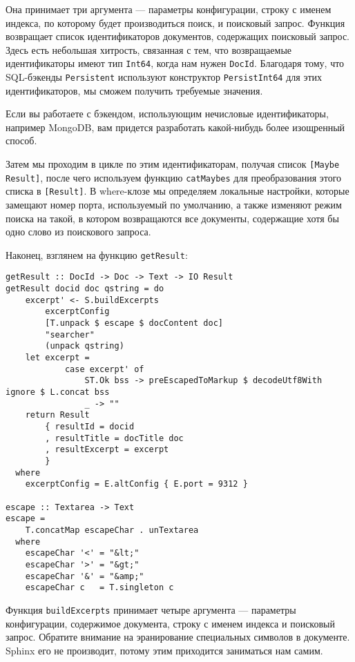 

Она принимает три аргумента --- параметры конфигурации, строку с именем индекса, по которому будет производиться поиск, и поисковый запрос. Функция возвращает список идентификаторов документов, содержащих поисковый запрос. Здесь есть небольшая хитрость, связанная с тем, что возвращаемые идентификаторы имеют тип \lstinline'Int64', когда нам нужен \lstinline'DocId'. Благодаря тому, что SQL-бэкенды \lstinline'Persistent' используют конструктор \lstinline'PersistInt64' для этих идентификаторов, мы сможем получить требуемые значения.

Если вы работаете с бэкендом, использующим нечисловые идентификаторы, например MongoDB, вам придется разработать какой-нибудь более изощренный способ.

Затем мы проходим в цикле по этим идентификаторам, получая список \lstinline'[Maybe Result]', после чего используем функцию \lstinline'catMaybes' для преобразования этого списка в \lstinline'[Result]'. В where-клозе мы определяем локальные настройки, которые замещают номер порта, используемый по умолчанию, а также изменяют режим поиска на такой, в котором возвращаются все документы, содержащие хотя бы одно слово из поискового запроса. %

Наконец, взглянем на функцию \lstinline'getResult':

\begin{lstlisting}
getResult :: DocId -> Doc -> Text -> IO Result
getResult docid doc qstring = do
    excerpt' <- S.buildExcerpts
        excerptConfig
        [T.unpack $ escape $ docContent doc]
        "searcher"
        (unpack qstring)
    let excerpt =
            case excerpt' of
                ST.Ok bss -> preEscapedToMarkup $ decodeUtf8With ignore $ L.concat bss
                _ -> ""
    return Result
        { resultId = docid
        , resultTitle = docTitle doc
        , resultExcerpt = excerpt
        }
  where
    excerptConfig = E.altConfig { E.port = 9312 }

escape :: Textarea -> Text
escape =
    T.concatMap escapeChar . unTextarea
  where
    escapeChar '<' = "&lt;"
    escapeChar '>' = "&gt;"
    escapeChar '&' = "&amp;"
    escapeChar c   = T.singleton c
\end{lstlisting}

Функция \lstinline'buildExcerpts' принимает четыре аргумента --- параметры конфигурации, содержимое документа, строку с именем индекса и поисковый запрос. Обратите внимание на эранирование специальных символов в документе. Sphinx его не производит, потому этим приходится заниматься нам самим.

